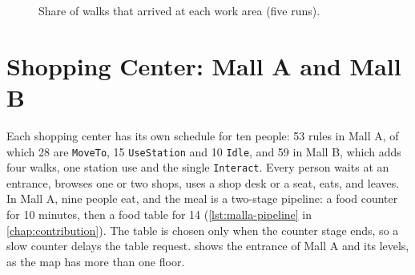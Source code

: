 \begin{figure}[H]
\centering
{}
\caption[Walks that arrived at each work area]{Share of walks that arrived at each work area (five runs).}
\label{fig:app-dul-arrivals}
\end{figure}

\section{Shopping Center: Mall A and Mall B}
\label{sec:app-mall}

\label{sub:app-mall-authored}

Each shopping center has its own schedule for ten people: 53 rules in Mall A, of which 28 are \texttt{MoveTo}, 15 \texttt{UseStation} and 10 \texttt{Idle}, and 59 in Mall B, which adds four walks, one station use and the single \texttt{Interact}. Every person waits at an entrance, browses one or two shops, uses a shop desk or a seat, eats, and leaves. In Mall A, nine people eat, and the meal is a two-stage pipeline: a food counter for 10 minutes, then a food table for 14 (\cref{lst:malla-pipeline} in \cref{chap:contribution}). The table is chosen only when the counter stage ends, so a slow counter delays the table request.  shows the entrance of Mall A and its levels, as the map has more than one floor.


